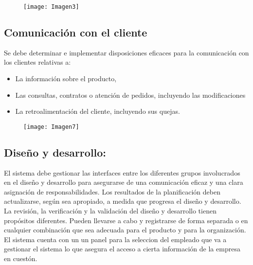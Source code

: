 \documentclass[11 pt]{article}
\begin{document}
\begin{figure}[h]
	\centering
	\texttt{[image: Imagen3]}
\end{figure}

\vspace{1cm}
\subsection{Comunicación con el cliente}
Se debe determinar e implementar disposiciones eficaces para la comunicación con los clientes relativas a:
\begin{itemize}
	\item La información sobre el producto,
	\item Las consultas, contratos o atención de pedidos, incluyendo las modificaciones
	\item La retroalimentación del cliente, incluyendo sus quejas.	
\end{itemize}
\vspace{1cm}
\begin{figure}[h]
	\centering
	\texttt{[image: Imagen7]}
\end{figure}
\vspace{1cm}
\subsection{Diseño y desarrollo:}
El sistema debe gestionar las interfaces entre los diferentes grupos involucrados en el diseño y desarrollo para asegurarse de una comunicación eficaz y una clara asignación de responsabilidades.
Los resultados de la planificación deben actualizarse, según sea apropiado, a medida que progresa el diseño y desarrollo. La revisión, la verificación y la validación del diseño y desarrollo tienen propósitos diferentes. Pueden llevarse a cabo y registrarse de forma separada o en cualquier combinación que sea adecuada para el producto y para la organización. El sistema cuenta con un un panel para la seleccion del empleado que va a gestionar el sistema lo que asegura el acceso a cierta información de la empresa en cuestón.
\vspace{1cm}
\end{document}
